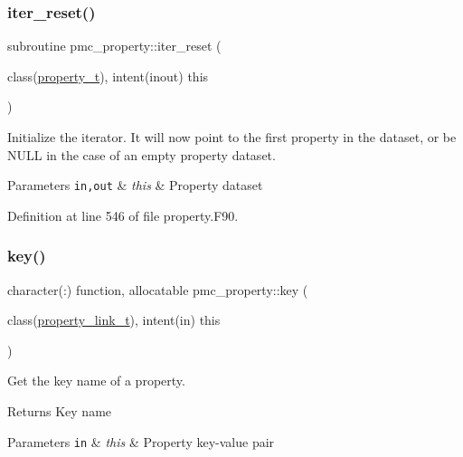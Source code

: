 \subsubsection{\texorpdfstring{iter\+\_\+reset()}{iter\_reset()}}
{\footnotesize\ttfamily subroutine pmc\+\_\+property\+::iter\+\_\+reset (\begin{DoxyParamCaption}\item[{class(\mbox{\hyperlink{structpmc__property_1_1property__t}{property\+\_\+t}}), intent(inout)}]{this }\end{DoxyParamCaption})\hspace{0.3cm}{\ttfamily [private]}}



Initialize the iterator. It will now point to the first property in the dataset, or be N\+U\+LL in the case of an empty property dataset. 


\begin{DoxyParams}[1]{Parameters}
\mbox{\tt in,out}  & {\em this} & Property dataset \\
\hline
\end{DoxyParams}


Definition at line 546 of file property.\+F90.

\mbox{\label{namespacepmc__property_a733aef8cbd02fbfed19bde913728678e}} 
\subsubsection{\texorpdfstring{key()}{key()}}
{\footnotesize\ttfamily character(\+:) function, allocatable pmc\+\_\+property\+::key (\begin{DoxyParamCaption}\item[{class(\mbox{\hyperlink{structpmc__property_1_1property__link__t}{property\+\_\+link\+\_\+t}}), intent(in)}]{this }\end{DoxyParamCaption})\hspace{0.3cm}{\ttfamily [private]}}



Get the key name of a property. 

\begin{DoxyReturn}{Returns}
Key name
\end{DoxyReturn}

\begin{DoxyParams}[1]{Parameters}
\mbox{\tt in}  & {\em this} & Property key-\/value pair \\
\hline
\end{DoxyParams}


